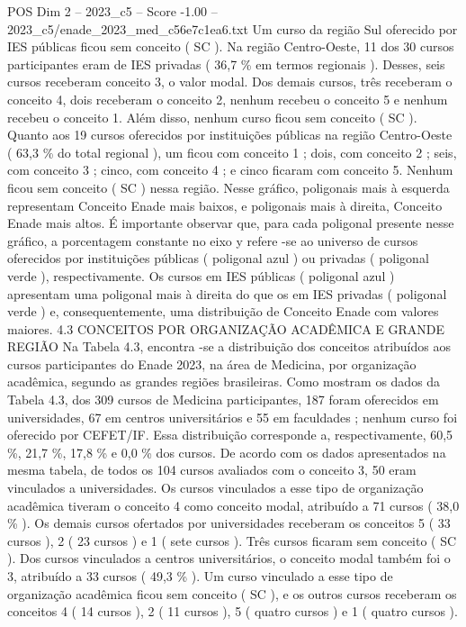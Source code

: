 \begin{textsample}{POS Dim 2 – 2023\_c5 – Score -1.00 – 2023\_c5/enade\_2023\_med\_c56e7c1ea6.txt}
Um curso da região Sul oferecido por IES públicas ficou sem conceito ( SC ).
Na região Centro-Oeste, 11 dos 30 cursos participantes eram de IES privadas ( 36,7 \% em termos regionais ).
Desses, seis cursos receberam conceito 3, o valor modal.
Dos demais cursos, três receberam o conceito 4, dois receberam o conceito 2, nenhum recebeu o conceito 5 e nenhum recebeu o conceito 1.
Além disso, nenhum curso ficou sem conceito ( SC ).
Quanto aos 19 cursos oferecidos por instituições públicas na região Centro-Oeste ( 63,3 \% do total regional ), um ficou com conceito 1 ; dois, com conceito 2 ; seis, com conceito 3 ; cinco, com conceito 4 ; e cinco ficaram com conceito 5.
Nenhum ficou sem conceito ( SC ) nessa região.
Nesse gráfico, poligonais mais à esquerda representam Conceito Enade mais baixos, e poligonais mais à direita, Conceito Enade mais altos.
É importante observar que, para cada poligonal presente nesse gráfico, a porcentagem constante no eixo y refere -se ao universo de cursos oferecidos por instituições públicas ( poligonal azul ) ou privadas ( poligonal verde ), respectivamente.
Os cursos em IES públicas ( poligonal azul ) apresentam uma poligonal mais à direita do que os em IES privadas ( poligonal verde ) e, consequentemente, uma distribuição de Conceito Enade com valores maiores. 4.3 CONCEITOS POR ORGANIZAÇÃO ACADÊMICA E GRANDE REGIÃO Na Tabela 4.3, encontra -se a distribuição dos conceitos atribuídos aos cursos participantes do Enade 2023, na área de Medicina, por organização acadêmica, segundo as grandes regiões brasileiras.
Como mostram os dados da Tabela 4.3, dos 309 cursos de Medicina participantes, 187 foram oferecidos em universidades, 67 em centros universitários e 55 em faculdades ; nenhum curso foi oferecido por CEFET/IF.
Essa distribuição corresponde a, respectivamente, 60,5 \%, 21,7 \%, 17,8 \% e 0,0 \% dos cursos.
De acordo com os dados apresentados na mesma tabela, de todos os 104 cursos avaliados com o conceito 3, 50 eram vinculados a universidades.
Os cursos vinculados a esse tipo de organização acadêmica tiveram o conceito 4 como conceito modal, atribuído a 71 cursos ( 38,0 \% ).
Os demais cursos ofertados por universidades receberam os conceitos 5 ( 33 cursos ), 2 ( 23 cursos ) e 1 ( sete cursos ).
Três cursos ficaram sem conceito ( SC ).
Dos cursos vinculados a centros universitários, o conceito modal também foi o 3, atribuído a 33 cursos ( 49,3 \% ).
Um curso vinculado a esse tipo de organização acadêmica ficou sem conceito ( SC ), e os outros cursos receberam os conceitos 4 ( 14 cursos ), 2 ( 11 cursos ), 5 ( quatro cursos ) e 1 ( quatro cursos ).

\end{textsample}
